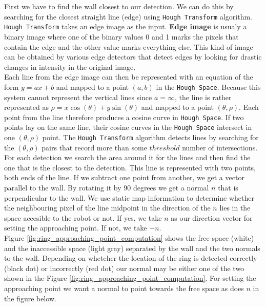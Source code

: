 \documentclass[12pt,a4paper]{article}
\begin{document}
	First we have to find the wall closest to our detection. We can do this by searching for the closest straight line (edge) using \texttt{Hough Transform} algorithm. \texttt{Hough Transform} takes an edge image as the input. \textbf{Edge image} is usualy a binary image where one of the binary values 0 and 1 marks the pixels that contain the edge and the other value marks everything else. This kind of image can be obtained by various edge detectors that detect edges by looking for drastic changes in intensity in the original image. \\
	
	Each line from the edge image can then be represented with an equation of the form $y = ax + b$ and mapped to a point $(a, b)$ in the \texttt{Hough Space}. Because this system cannot represent the vertical lines since $a = \infty$, the line is rather represented as $\rho = x\cos(\theta) + y\sin(\theta)$ and mapped to a point $(\theta, \rho)$. Each point from the line therefore produces a cosine curve in \texttt{Hough Space}. If two points lay on the same line, their cosine curves in the \texttt{Hough Space} intersect in one $(\theta, \rho)$ point. The \texttt{Hough Transform} algorithm detects lines by searching for the $(\theta, \rho)$ pairs that record more than some $threshold$ number of intersections. \\

	For each detection we search the area around it for the lines and then find the one that is the closest to the detection. This line is represented with two points, both ends of the line. If we subtract one point from another, we get a vector parallel to the wall. By rotating it by 90 degrees we get a normal $n$ that is perpendicular to the wall. We use static map information to determine whether the neighbouring pixel of the line midpoint in the direction of the $n$ lies in the space accesible to the robot or not. If yes, we take $n$ as our direction vector for setting the approaching point. If not, we take $-n$. \\

	Figure \ref{fig:ring_approaching_point_computation} shows the free space (white) and the inaccessible space (light gray) separated by the wall and the two normals to the wall. Depending on wheteher the location of the ring is detected correctly (black dot) or incorrectly (red dot) our normal may be either one of the two shown in the Figure \ref{fig:ring_approaching_point_computation}. For setting the approaching point we want a normal to point towards the free space as does $n$ in the figure below.
\end{document}
